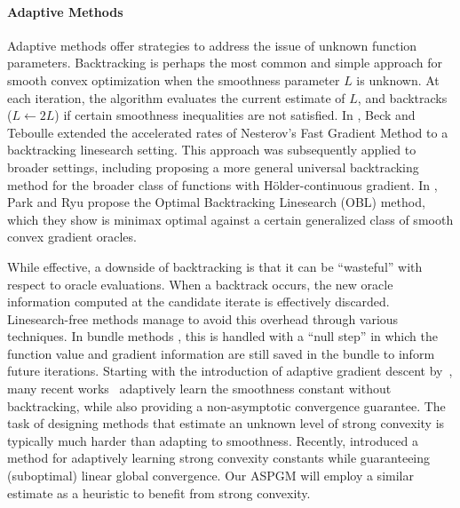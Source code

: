 \documentclass[11pt]{article}
\numberwithin{equation}{section}
\theoremstyle{definition}
\theoremstyle{plain}
\theoremstyle{definition}
\begin{document}
\paragraph{Adaptive Methods}
Adaptive methods offer strategies to address the issue of unknown function parameters. Backtracking is perhaps the most common and simple approach for smooth convex optimization when the smoothness parameter $L$ is unknown. At each iteration, the algorithm evaluates the current estimate of $L$, and backtracks ($L \leftarrow 2L$) if certain smoothness inequalities are not satisfied. In \cite{FISTA_BeckTeboulle}, Beck and Teboulle extended the accelerated rates of Nesterov's Fast Gradient Method \cite{Nesterov} to a backtracking linesearch setting. This approach was subsequently applied to broader settings, including \cite{UFGM_Nesterov} proposing a more general universal backtracking method for the broader class of functions with H\"{o}lder-continuous gradient. In \cite{OBL}, Park and Ryu propose the Optimal Backtracking Linesearch (OBL) method, which they show is minimax optimal against a certain generalized class of smooth convex gradient oracles.

While effective, a downside of backtracking is that it can be ``wasteful'' with respect to oracle evaluations. When a backtrack occurs, the new oracle information computed at the candidate iterate is effectively discarded.
Linesearch-free methods manage to avoid this overhead through various techniques. In bundle methods \cite{Bundle_Kiwiel,BundleProximity_Kiwiel, VariantsOfBundleMethods,BundleLevel_Lan}, this is handled with a ``null step'' in which the function value and gradient information are still saved in the bundle to inform future iterations. Starting with the introduction of adaptive gradient descent by~\cite{AdGD_Malitsky}, many recent works~\cite{AdaNAG_Suh,AdGD_Prox2_Malitsky,ACFGM_Li,AdaptiveProximalLocalLipschitz_Latafat,LinesearchFreeNonconvex_Yagishita,AdaptiveUniversal_Oikonomidis,AutoconditionedProjected_LanLiXu} adaptively learn the smoothness constant without backtracking, while also providing a non-asymptotic convergence guarantee. The task of designing methods that estimate an unknown level of strong convexity is typically much harder than adapting to smoothness. Recently, \cite{NAGFree_Cavalcanti} introduced a method for adaptively learning strong convexity constants while guaranteeing (suboptimal) linear global convergence. Our ASPGM will employ a similar estimate as a heuristic to benefit from strong convexity.
\end{document}
